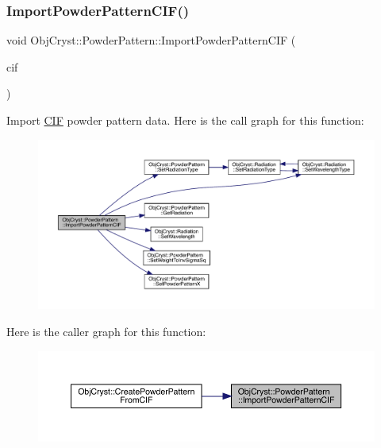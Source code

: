 \subsubsection{\texorpdfstring{ImportPowderPatternCIF()}{ImportPowderPatternCIF()}}
{\footnotesize\ttfamily void Obj\+Cryst\+::\+Powder\+Pattern\+::\+Import\+Powder\+Pattern\+C\+IF (\begin{DoxyParamCaption}\item[{const \mbox{\hyperlink{class_obj_cryst_1_1_c_i_f}{C\+IF}} \&}]{cif }\end{DoxyParamCaption})}

Import \mbox{\hyperlink{class_obj_cryst_1_1_c_i_f}{C\+IF}} powder pattern data. Here is the call graph for this function\+:
\nopagebreak
\begin{figure}[H]
\begin{center}
\leavevmode
\includegraphics[width=350pt]{class_obj_cryst_1_1_powder_pattern_a50348c3084e39c0c8f46a3ddccc03e1f_cgraph}
\end{center}
\end{figure}
Here is the caller graph for this function\+:
\nopagebreak
\begin{figure}[H]
\begin{center}
\leavevmode
\includegraphics[width=350pt]{class_obj_cryst_1_1_powder_pattern_a50348c3084e39c0c8f46a3ddccc03e1f_icgraph}
\end{center}
\end{figure}
\mbox{\label{class_obj_cryst_1_1_powder_pattern_a4499e38a96db3f3c0abdb6d30f3400e1}} 
